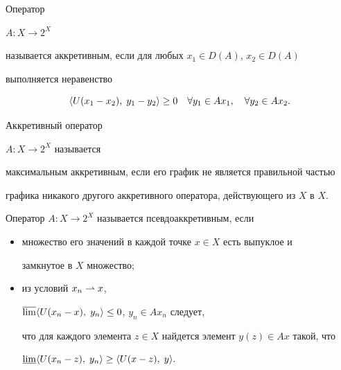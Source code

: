  




\begin{defn} Оператор 


$A:X\to 2^X$ 


называется аккретивным, если для любых $x_1\in D(A)$, $x_2\in D(A)$ 


выполняется неравенство 


$$ 


\la U(x_1-x_2),\; y_1-y_2\ra \ge 0 \quad \forall y_1\in Ax_1,\quad 


\forall y_2\in Ax_2. 


$$ 


\end{defn} 


 


\begin{defn} Аккретивный оператор 


$A:X\to 2^X$ называется 


максимальным аккретивным, если его график не является правильной частью 


графика никакого другого аккретивного оператора, действующего из $X$ в $X$. 


\end{defn} 


 


\begin{defn} Оператор $A:X\to 2^X$ называется псевдоаккретивным, если 


\begin{itemize} 


\item[а)] множество его значений в каждой точке $x\in X$ есть выпуклое и 


замкнутое в $X$ множество; 


\item[б)] из условий $x_n\rightharpoonup x$, 


$\overline{\lim}\langle U(x_n-x),\;y_n\rangle\le 0$, $y_n\in Ax_n$ следует, 


что для каждого элемента $z\in X$ найдется элемент $y(z)\in Ax$ такой, что 


$\underline{\lim}\langle U(x_n-z),\;y_n\rangle\ge\langle U(x-z),\;y\rangle .$ 


\end{itemize} 


\end{defn} 


